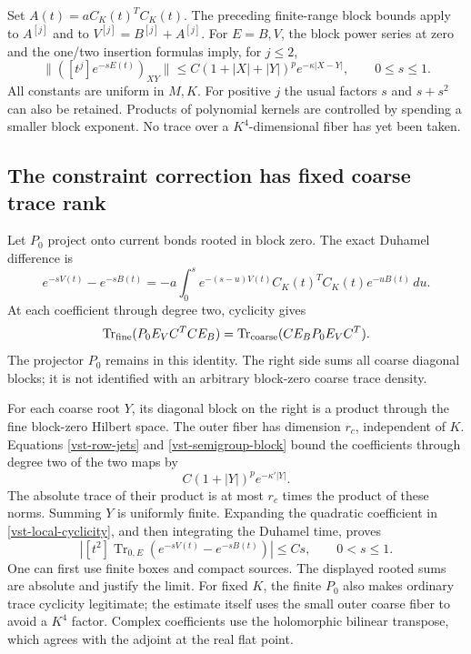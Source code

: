 \documentclass[11pt]{article}
\theoremstyle{remark}
\begin{document}
Set \(A(t)=aC_K(t)^TC_K(t)\). The preceding finite-range
block bounds apply to \(A^{[j]}\) and to
\(V^{[j]}=B^{[j]}+A^{[j]}\).
For \(E=B,V\), the block power series at zero and the
one/two insertion formulas imply, for \(j\le2\),
\begin{equation}
 \big\|([t^j]e^{-sE(t)})_{XY}\big\|
 \le C(1+|X|+|Y|)^p e^{-\kappa|X-Y|},
                         \qquad 0\le s\le1.
 \label{vst-semigroup-block}
\end{equation}
All constants are uniform in \(M,K\).
For positive \(j\) the usual factors \(s\) and
\(s+s^2\) can also be retained. Products of polynomial
kernels are controlled by spending a smaller block
exponent. No trace over a \(K^4\)-dimensional fiber
has yet been taken.

\subsection{The constraint correction has fixed coarse trace rank}
\label{vst-rank-section}

Let \(P_0\) project onto current bonds rooted in block zero.
The exact Duhamel difference is
\begin{equation}
 e^{-sV(t)}-e^{-sB(t)}
   =-a\int_0^s e^{-(s-u)V(t)}
              C_K(t)^TC_K(t)e^{-uB(t)}\,du.
 \label{vst-difference}
\end{equation}
At each coefficient through degree two, cyclicity gives
\begin{equation}
 \operatorname{Tr}_{\rm fine}
           (P_0E_VC^TCE_B)
       =\operatorname{Tr}_{\rm coarse}
           (CE_BP_0E_VC^T).
 \label{vst-local-cyclicity}
\end{equation}
The projector \(P_0\) remains in this identity. The
right side sums all coarse diagonal blocks; it is
not identified with an arbitrary block-zero coarse
trace density.

For each coarse root \(Y\), its diagonal block on the
right is a product through the fine block-zero Hilbert
space. The outer fiber has dimension \(r_c\), independent
of \(K\). Equations \eqref{vst-row-jets} and
\eqref{vst-semigroup-block} bound the coefficients through
degree two of the two maps by
\[
                     C(1+|Y|)^p e^{-\kappa'|Y|}.
\]
The absolute trace of their product is at most \(r_c\)
times the product of these norms. Summing \(Y\) is
uniformly finite. Expanding the quadratic coefficient
in \eqref{vst-local-cyclicity}, and then integrating
the Duhamel time, proves
\begin{equation}
 \left|[t^2]\operatorname{Tr}_{0,E}
          (e^{-sV(t)}-e^{-sB(t)})\right|
                    \le Cs,\qquad 0<s\le1.
 \label{vst-rank-bound}
\end{equation}
One can first use finite boxes and compact sources.
The displayed rooted sums are absolute and justify
the limit. For fixed \(K\), the finite \(P_0\) also
makes ordinary trace cyclicity legitimate; the
estimate itself uses the small outer coarse fiber
to avoid a \(K^4\) factor. Complex coefficients use
the holomorphic bilinear transpose, which agrees
with the adjoint at the real flat point.
\end{document}
